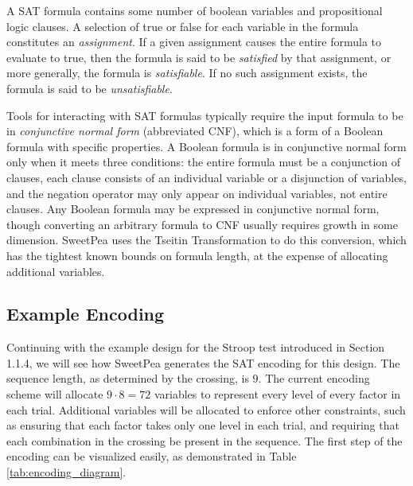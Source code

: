 A SAT formula contains some number of boolean variables and propositional logic clauses. A selection of true or false for each variable in the formula constitutes an \textit{assignment}. If a given assignment causes the entire formula to evaluate to true, then the formula is said to be \textit{satisfied} by that assignment, or more generally, the formula is \textit{satisfiable}. If no such assignment exists, the formula is said to be \textit{unsatisfiable}.

Tools for interacting with SAT formulas typically require the input formula to be in \textit{conjunctive normal form} (abbreviated CNF), which is a form of a Boolean formula with specific properties. A Boolean formula is in conjunctive normal form only when it meets three conditions: the entire formula must be a conjunction of clauses, each clause consists of an individual variable or a disjunction of variables, and the negation operator may only appear on individual variables, not entire clauses. Any Boolean formula may be expressed in conjunctive normal form, though converting an arbitrary formula to CNF usually requires growth in some dimension. SweetPea uses the Tseitin Transformation \cite{tseitin1983complexity} to do this conversion, which has the tightest known bounds on formula length, at the expense of allocating additional variables.

\subsection{Example Encoding}

Continuing with the example design for the Stroop test introduced in Section 1.1.4, we will see how SweetPea generates the SAT encoding for this design. The sequence length, as determined by the crossing, is $9$. The current encoding scheme will allocate $9 \cdot 8 = 72$ variables to represent every level of every factor in each trial. Additional variables will be allocated to enforce other constraints, such as ensuring that each factor takes only one level in each trial, and requiring that each combination in the crossing be present in the sequence. The first step of the encoding can be visualized easily, as demonstrated in Table \ref{tab:encoding_diagram}.

